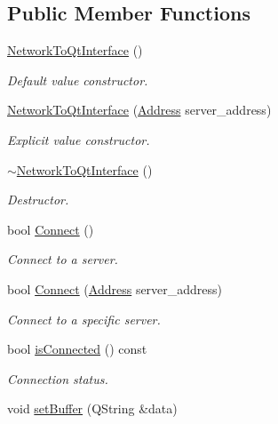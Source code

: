 \subsection*{Public Member Functions}
\begin{DoxyCompactItemize}
\item 
\hyperlink{classNetworkToQtInterface_a35d74d050d8317ad3643f56ca51dd400}{Network\-To\-Qt\-Interface} ()
\begin{DoxyCompactList}\small\item\em Default value constructor. \end{DoxyCompactList}\item 
\hyperlink{classNetworkToQtInterface_aa979e45a30e3fd430b5bc4298aa1831e}{Network\-To\-Qt\-Interface} (\hyperlink{classAddress}{Address} server\-\_\-address)
\begin{DoxyCompactList}\small\item\em Explicit value constructor. \end{DoxyCompactList}\item 
\hyperlink{classNetworkToQtInterface_a1af69a269ee8405c5786696846786e09}{$\sim$\-Network\-To\-Qt\-Interface} ()
\begin{DoxyCompactList}\small\item\em Destructor. \end{DoxyCompactList}\item 
bool \hyperlink{classNetworkToQtInterface_a756963d2d3590e52e5fbef2114066068}{Connect} ()
\begin{DoxyCompactList}\small\item\em Connect to a server. \end{DoxyCompactList}\item 
bool \hyperlink{classNetworkToQtInterface_af61a9805badd3d508f8f9619dc66f82d}{Connect} (\hyperlink{classAddress}{Address} server\-\_\-address)
\begin{DoxyCompactList}\small\item\em Connect to a specific server. \end{DoxyCompactList}\item 
bool \hyperlink{classNetworkToQtInterface_a2584e2afdb435bd83b9bd9bbec6214c3}{is\-Connected} () const 
\begin{DoxyCompactList}\small\item\em Connection status. \end{DoxyCompactList}\item 
void \hyperlink{classNetworkToQtInterface_aed3e3b56739941d40dd8f222f2bfc394}{set\-Buffer} (Q\-String \&data)

\end{DoxyCompactItemize}

